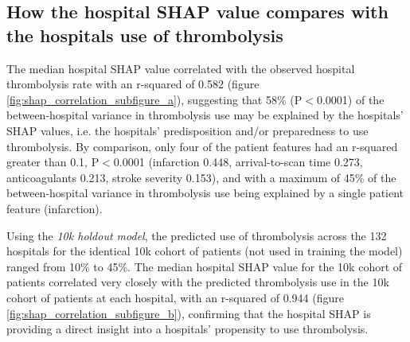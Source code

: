 \subsection{How the hospital SHAP value compares with the hospitals use of thrombolysis}

The median hospital SHAP value correlated with the observed hospital thrombolysis rate with an r-squared of 0.582 (figure \ref{fig:shap_correlation_subfigure_a}), suggesting that 58\% (P$<$0.0001) of the between-hospital variance in thrombolysis use may be explained by the hospitals' SHAP values, i.e. the hospitals' predisposition and/or preparedness to use thrombolysis. By comparison, only four of the patient features had an r-squared greater than 0.1, P$<$0.0001 (infarction 0.448, arrival-to-scan time 0.273, anticoagulants 0.213, stroke severity 0.153), and with a maximum of 45\% of the between-hospital variance in thrombolysis use being explained by a single patient feature (infarction).

Using the \emph{10k holdout model}, the predicted use of thrombolysis across the 132 hospitals for the identical 10k cohort of patients (not used in training the model) ranged from 10\% to 45\%. The median hospital SHAP value for the 10k cohort of patients correlated very closely with the predicted thrombolysis use in the 10k cohort of patients at each hospital, with an r-squared of 0.944 (figure \ref{fig:shap_correlation_subfigure_b}), confirming that the hospital SHAP is providing a direct insight into a hospitals' propensity to use thrombolysis.

